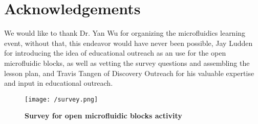 \section{Acknowledgements}
We would like to thank Dr. Yan Wu for organizing the microfluidics learning event, without that, this endeavor would have never been possible, Jay Ludden for introducing the idea of educational outreach as an use for the open microfluidic blocks, as well as vetting the survey questions and assembling the lesson plan, and Travis Tangen of Discovery Outreach for his valuable expertise and input in educational outreach.

\begin{figure}[h!] %
\centering
\texttt{[image: /survey.png]}
\caption[\textbf{Survey for open microfluidic blocks activity}]{\textbf{Survey for open microfluidic blocks activity}}
\label{figure:survey}
\end{figure}







